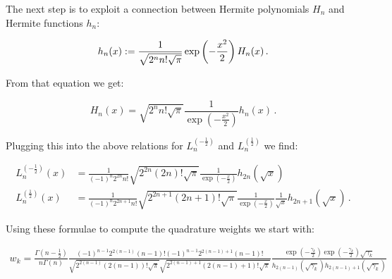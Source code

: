 \documentclass[a4paper,10pt]{article}
\begin{document}
The next step is to exploit a connection between Hermite
polynomials $H_n$ and Hermite functions $h_n$:

\begin{equation}
  h_n(x) := \frac{1}{\sqrt{2^n n! \sqrt{\pi}}}
                 \exp\left(-\frac{x^2}{2}\right)
                 H_n(x) \,.
\end{equation}

From that equation we get:

\begin{equation}
  H_n(x) = \sqrt{2^n n! \sqrt{\pi}} \frac{1}{\exp\left(-\frac{x^2}{2}\right)} h_n(x) \,.
\end{equation}

Plugging this into the above relations for $L_n^{\left(-\frac{1}{2}\right)}$ and $L_n^{\left(\frac{1}{2}\right)}$ we find:

\begin{equation}
\begin{split}
  L_n^{\left(-\frac{1}{2}\right)}(x) & = \frac{1}{(-1)^n 2^{2n} n!}
                                         \sqrt{2^{2n} (2n)! \sqrt{\pi}}
                                         \frac{1}{\exp\left(-\frac{x}{2}\right)}
                                         h_{2n}(\sqrt{x}) \\
  L_n^{\left(\frac{1}{2}\right)}(x) & = \frac{1}{(-1)^n 2^{2n+1} n!}
                                        \sqrt{2^{2n+1} (2n+1)! \sqrt{\pi}}
                                        \frac{1}{\exp\left(-\frac{x}{2}\right)}
                                        \frac{1}{\sqrt{x}}
                                        h_{2n+1}(\sqrt{x}) \,.
\end{split}
\end{equation}

Using these formulae to compute the quadrature weights we start with:

\begin{equation}
\begin{split}
  w_k =
  \frac{\Gamma(n-\frac{1}{2})}{n \Gamma(n)}
  \frac{
        (-1)^{n-1} 2^{2(n-1)} (n-1)!
        (-1)^{n-1} 2^{2(n-1)+1} (n-1)!
       }{
        \sqrt{2^{2(n-1)} (2(n-1))! \sqrt{\pi}}
        \sqrt{2^{2(n-1)+1} (2(n-1)+1)! \sqrt{\pi}}
        }
  \frac{
        \exp(-\frac{\gamma_k}{2}) \exp(-\frac{\gamma_k}{2}) \sqrt{\gamma_k}
       }{
        h_{2(n-1)}(\sqrt{\gamma_k})
        h_{2(n-1)+1}(\sqrt{\gamma_k})
       }
\end{split}
\end{equation}
\end{document}
